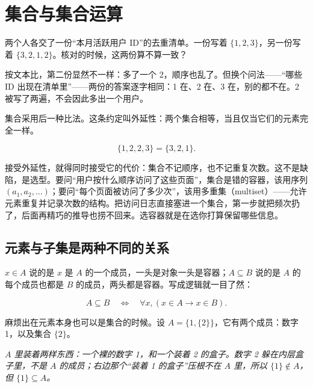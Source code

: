 \section{集合与集合运算}
\label{sec:01-Mathematical-Language/02-Sets-Relations-Functions/01}

两个人各交了一份``本月活跃用户 ID''的去重清单。一份写着 \(\{1,2,3\}\)，另一份写着 \(\{3,2,1,2\}\)。核对的时候，这两份算不算一致？

按文本比，第二份显然不一样：多了一个 2，顺序也乱了。但换个问法——``哪些 ID 出现在清单里''——两份的答案逐字相同：1 在、2 在、3 在，别的都不在。2 被写了两遍，不会因此多出一个用户。

集合采用后一种比法。这条约定叫外延性：两个集合相等，当且仅当它们的元素完全一样。

\[
\{1,2,2,3\}=\{3,2,1\}.
\]

接受外延性，就得同时接受它的代价：集合不记顺序，也不记重复次数。这不是缺陷，是选型。要问``用户按什么顺序访问了这些页面''，集合是错的容器，该用序列 \((a_1,a_2,\ldots)\)；要问``每个页面被访问了多少次''，该用多重集（multiset）——允许元素重复并记录次数的结构。把访问日志直接塞进一个集合，第一步就把频次扔了，后面再精巧的推导也捞不回来。选容器就是在选你打算保留哪些信息。

\subsection{元素与子集是两种不同的关系}

\(x\in A\) 说的是 \(x\) 是 \(A\) 的一个成员，一头是对象一头是容器；\(A\subseteq B\) 说的是 \(A\) 的每个成员也都是 \(B\) 的成员，两头都是容器。写成逻辑就一目了然：

\[
A\subseteq B
\quad\Longleftrightarrow\quad
\forall x,(x\in A\to x\in B).
\]

麻烦出在元素本身也可以是集合的时候。设 \(A=\{1,\{2\}\}\)，它有两个成员：数字 1，以及集合 \(\{2\}\)。

\begin{center}

\emph{\(A\) 里装着两样东西：一个裸的数字 1，和一个装着 2 的盒子。数字 2 躲在内层盒子里，不是 \(A\) 的成员；右边那个``装着 1 的盒子''压根不在 \(A\) 里，所以 \(\{1\}\notin A\)，但 \(\{1\}\subseteq A\)。}
\end{center}

